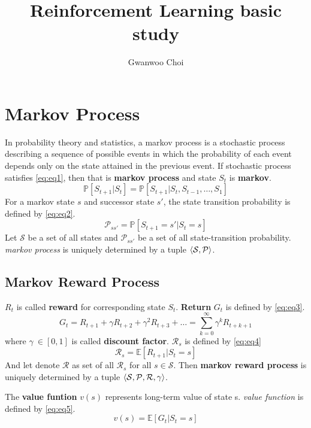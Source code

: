 \documentclass[
	10pt, %
]{article}
\title{Reinforcement Learning basic study}
\author{Gwanwoo Choi}
\newcommand{\mbb}[1]{\mathbb{#1}}
\newcommand{\mc}[1]{\mathcal{#1}}
\newcommand{\tb}[1]{\textbf{#1}}
\newcommand{\ti}[1]{\textit{#1}}
\numberwithin{equation}{subsection} %
\begin{document}
\maketitle
\newpage
\tableofcontents
\newpage
\section{Markov Process}
In probability theory and statistics, a markov process is a stochastic process describing a sequence of possible events in which the probability of each event depends only on the state attained in the previous event.
If stochastic process satisfies \cref{eq:eq1}, then that is \tb{markov process} and state $S_t$ is \tb{markov}.
\begin{equation} \label{eq:eq1}
    \mbb{P}[S_{t+1}|S_t] = \mbb{P}[S_{t+1}|S_t,S_{t-1},\dots,S_{1}]
\end{equation}
For a markov state $s$ and successor state $s'$, the state transition probability is defined by \cref{eq:eq2}.
\begin{equation} \label{eq:eq2}
    \mc{P}_{ss'} = \mbb{P}[S_{t+1} = s' | S_t = s]
\end{equation}
Let $\mc{S}$ be a set of all states and $\mc{P}_{ss'}$ be a set of all state-transition probability.
 \ti{markov process} is uniquely determined by a tuple $\braket{\mc{S}, \mc{P}}$. 


\subsection{Markov Reward Process}


$R_t$ is called \tb{reward} for corresponding state $S_t$. \tb{Return} $G_t$ is defined by \cref{eq:eq3}.   
\begin{equation} \label{eq:eq3}
    G_t = R_{t+1} + \gamma R_{t+2} + \gamma^2 R_{t+3} + \dots = \sum^{\infty}_{k=0}\gamma^k R_{t+k+1}
\end{equation}
where $\gamma \ \in [0,1] $ is called \tb{discount factor}.
$\mc{R}_s$ is defined by \cref{eq:eq4}
\begin{equation} \label{eq:eq4}
    \mc{R}_s = \mbb{E}[R_{t+1}|S_t=s]
\end{equation}
And let denote $\mc{R}$ as set of all $\mc{R}_s$ for all $s \in \mc{S}$. Then \tb{markov reward process} is uniquely determined by a tuple $\braket{\mc{S}, \mc{P}, \mc{R}, \gamma}$.

The \tb{value funtion} $v(s)$ represents long-term value of state s. \ti{value function} is defined by \cref{eq:eq5}.
\begin{equation} \label{eq:eq5}
    v(s) = \mbb{E}[G_t|S_t=s]
\end{equation}
\end{document}
